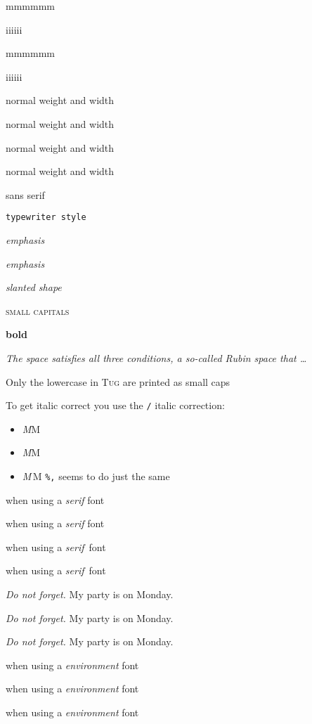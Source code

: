 \documentclass[12pt,twocolumn]{amsart}
\newcommand{\bsl}{\texttt{\symbol{92}}}
\begin{document}
\begin{itemize}
    \item[] mmmmmm
    \item[] iiiiii 
{\ttfamily
    \item[] mmmmmm
    \item[] iiiiii
}
    \item[] \textnormal{normal weight and width}
    \item[] \textrm{normal weight and width}
    \item[] \textmd{normal weight and width}
    \item[] \textup{normal weight and width}
    \item[] \textsf{sans serif}
    \item[] \texttt{typewriter style}
    \item[] \emph{emphasis}
    \item[] \textit{emphasis}
    \item[] \textsl{slanted shape}
    \item[] \textsc{small capitals}
    \item[] \textbf{bold}
\end{itemize}

\textit{The space satisfies all three conditions, a so-called
\emph{Rubin space} that \dots}

Only the lowercase in \textsc{Tug} are printed as small caps

To get italic correct you use the \bsl\texttt{/} italic correction:
\begin{itemize}
    \item[] {\itshape M}M
    \item[] {\itshape M\/}M
    \item[] {\itshape M}\,M \texttt{\%\bsl,} seems to do just the same
\end{itemize}

when using a {\itshape serif} font\par
when using a {\itshape serif\/} font\par
when using a {\itshape serif\,} font\par
when using a {\itshape serif}\, font\par

{\itshape Do not forget.} My party is on Monday.\par
\textit{Do not forget.} My party is on Monday.\par
{\itshape Do not forget.\/} My party is on Monday.

when using a {\em environment\/} font\par
when using a {\em environment} font\par
when using a \emph{environment} font\par
\end{document}
